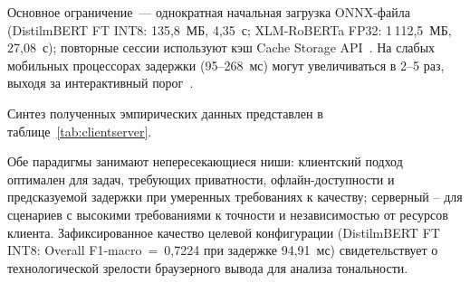 Основное ограничение~— однократная начальная загрузка ONNX-файла (DistilmBERT FT INT8: 135{,}8~МБ, 4{,}35~с; XLM-RoBERTa FP32: 1\,112{,}5~МБ, 27{,}08~с); повторные сессии используют кэш Cache Storage API~\cite{webdev2021coop}. На слабых мобильных процессорах задержки (95–268~мс) могут увеличиваться в 2–5 раз, выходя за интерактивный порог~\cite{jia2024empowering}.

Синтез полученных эмпирических данных представлен в таблице~\ref{tab:clientserver}.

\begin{table}[ht]
\centering
\caption{Сравнительный анализ клиентского и серверного подходов}
\label{tab:clientserver}
\end{table}

Обе парадигмы занимают непересекающиеся ниши: клиентский подход оптимален для задач, требующих приватности, офлайн-доступности и предсказуемой задержки при умеренных требованиях к качеству; серверный – для сценариев с высокими требованиями к точности и независимостью от ресурсов клиента. Зафиксированное качество целевой конфигурации (DistilmBERT FT INT8: Overall F1-macro~=~0{,}7224 при задержке 94{,}91~мс) свидетельствует о технологической зрелости браузерного вывода для анализа тональности.